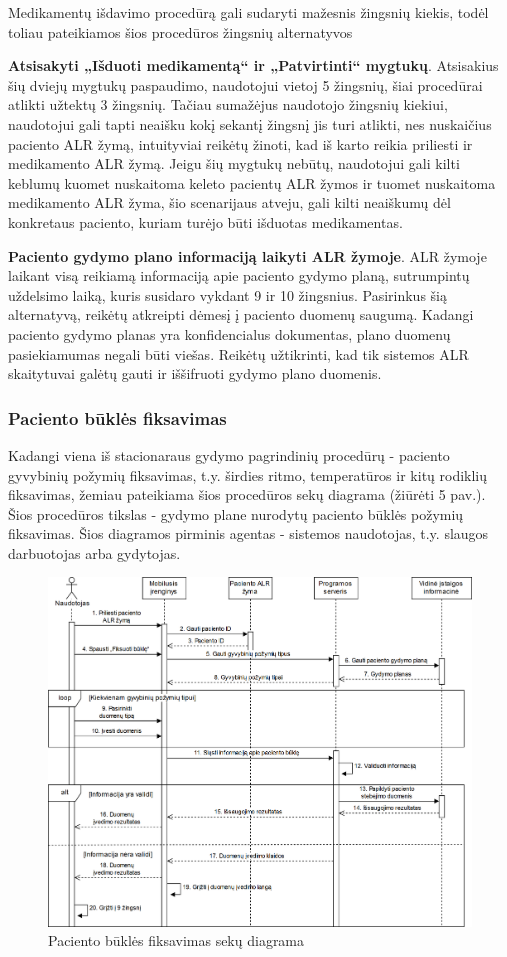 Medikamentų išdavimo procedūrą gali sudaryti mažesnis žingsnių kiekis, todėl toliau pateikiamos šios procedūros žingsnių alternatyvos


\textbf{Atsisakyti „Išduoti medikamentą“ ir „Patvirtinti“ mygtukų}. Atsisakius šių dviejų mygtukų paspaudimo, naudotojui vietoj 5 žingsnių, šiai procedūrai atlikti užtektų 3 žingsnių. Tačiau sumažėjus naudotojo žingsnių kiekiui, naudotojui gali tapti neaišku kokį sekantį žingsnį jis turi atlikti, nes nuskaičius paciento ALR žymą, intuityviai reikėtų žinoti, kad iš karto reikia priliesti ir medikamento ALR žymą. Jeigu šių mygtukų nebūtų, naudotojui gali kilti keblumų kuomet nuskaitoma keleto pacientų ALR žymos ir tuomet nuskaitoma medikamento ALR žyma, šio scenarijaus atveju, gali kilti neaiškumų dėl konkretaus paciento, kuriam turėjo būti išduotas medikamentas.

\textbf{Paciento gydymo plano informaciją laikyti ALR žymoje}. ALR žymoje laikant visą reikiamą informaciją apie paciento gydymo planą, sutrumpintų uždelsimo laiką, kuris susidaro vykdant 9 ir 10 žingsnius. Pasirinkus šią alternatyvą, reikėtų atkreipti dėmesį į paciento duomenų saugumą. Kadangi paciento gydymo planas yra konfidencialus dokumentas, plano duomenų pasiekiamumas negali būti viešas. Reikėtų užtikrinti, kad tik sistemos ALR skaitytuvai galėtų gauti ir iššifruoti gydymo plano duomenis.

\subsubsection{Paciento būklės fiksavimas}
Kadangi viena iš stacionaraus gydymo pagrindinių procedūrų - paciento gyvybinių požymių fiksavimas, t.y. širdies ritmo, temperatūros ir kitų rodiklių fiksavimas, žemiau pateikiama šios procedūros sekų diagrama (žiūrėti 5 pav.). Šios procedūros tikslas - gydymo plane nurodytų paciento būklės požymių fiksavimas. Šios diagramos pirminis agentas - sistemos naudotojas, t.y. slaugos darbuotojas arba gydytojas.

\begin{figure}[H]
    \centering
    \includegraphics[scale=0.27]{images/buklesFiksavimas}
    \caption{Paciento būklės fiksavimas sekų diagrama} 
\end{figure}

